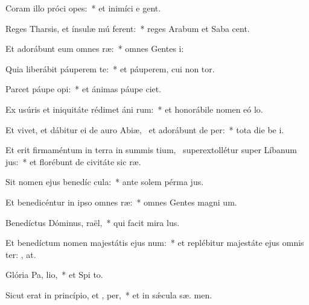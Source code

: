 \item Coram illo próci opes:~* et inimíci e  gent.
\item Reges Tharsis, et ínsulæ mú ferent:~* reges Arabum et Saba  cent.
\item Et adorábunt eum omnes  ræ:~* omnes Gentes  i:
\item Quia liberábit páuperem  te:~* et páuperem, cui non  tor.
\item Parcet páupe  opi:~* et ánimas páupe  ciet.
\item Ex usúris et iniquitáte rédimet áni rum:~* et honorábile nomen eó  lo.
\item Et vivet, et dábitur ei de auro Abiæ,~\pscross{} et adorábunt de  per:~* tota die be i.
\item Et erit firmaméntum in terra in summis tium,~\pscross{} superextollétur super Líbanum  jus:~* et florébunt de civitáte sic  ræ.
\item Sit nomen ejus benedíc  cula:~* ante solem pérma  jus.
\item Et benedicéntur in ipso omnes  ræ:~* omnes Gentes magni um.
\item Benedíctus Dóminus,  raël,~* qui facit mira lus.
\item Et benedíctum nomen majestátis ejus  num:~* et replébitur majestáte ejus omnis ter: , at.
\item Glória Pa,  lio,~* et Spi to.
\item Sicut erat in princípio, et ,  per,~* et in sǽcula sæ. men.

